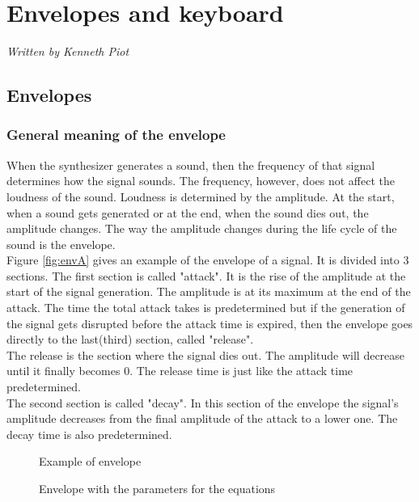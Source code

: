 \chapter{Envelopes and keyboard} %
\label{Chapter3} %
\textsf{\textsl{Written by Kenneth Piot}}
\section{Envelopes}
\subsection{General meaning of the envelope}
When the synthesizer generates a sound, then the frequency of that signal determines how the signal sounds. The frequency, however, does not affect the loudness of the sound. Loudness is determined by the amplitude. At the start, when a sound gets generated or at the end, when the sound dies out, the amplitude changes. The way the amplitude changes during the life cycle of the sound is the envelope.\\
Figure \ref{fig:envA} gives an example of the envelope of a signal. It is divided into 3 sections. The first section is called "attack". It is the rise of the amplitude at the start of the signal generation. The amplitude is at its maximum at the end of the attack. The time the total attack takes is predetermined but if the generation of the signal gets disrupted before the attack time is expired, then the envelope goes directly to the last(third) section, called "release".\\
The release is the section where the signal dies out. The amplitude will decrease until it finally becomes 0. The release time is just like the attack time predetermined.\\
The second section is called "decay". In this section of the envelope the signal's amplitude decreases from the final amplitude of the attack to a lower one. The decay time is also predetermined.\\
\begin{figure}[!ht]
  \hfill
  \begin{minipage}[t]{.45\textwidth}
    \begin{center}  
      \caption{Example of envelope}
      \label{fig:envA}
    \end{center}
  \end{minipage}
  \hfill
  \begin{minipage}[t]{.45\textwidth}
    \begin{center}  
      \caption{Envelope with the parameters for the equations}
      \label{fig:envB}
    \end{center}
  \end{minipage}
  \hfill
\end{figure}\\
